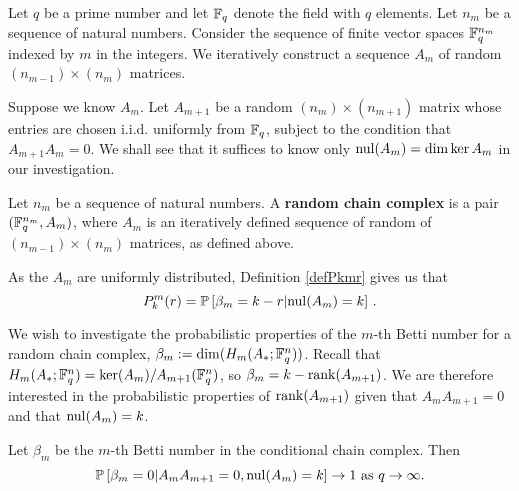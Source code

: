Let $q$ be a prime number and let $\mathbb{F}_q$ denote the field with $q$ elements. Let $n_m$ be a sequence of natural numbers. Consider the sequence of finite vector spaces $\mathbb{F}_q^{n_m}$ indexed by $m$ in the integers.  We iteratively construct a sequence $A_m$ of random $(n_{m-1})\times (n_m)$ matrices.

Suppose we know $A_{m}$. Let $A_{m+1}$ be a random $(n_{m})\times (n_{m+1})$ matrix whose entries are chosen i.i.d. uniformly from $\mathbb{F}_q$, subject to the condition that $A_{m+1}A_{m} = 0$. We shall see that it suffices to know only $\mathrm{nul}(A_m) = \dim\ker A_{m}$ in our investigation.

\begin{definition}
Let $n_m$ be a sequence of natural numbers. A \textbf{random chain complex} is a pair $(\mathbb{F}_q^{n_m},A_m)$, where $A_m$ is an iteratively defined sequence of random of $(n_{m-1})\times (n_m)$ matrices, as defined above.  
\end{definition}

As the $A_m$ are uniformly distributed, Definition \ref{defPkmr} gives us that
\[
P^m_k(r) = \mathbb{P}\left[\beta_m = k-r | \mathrm{nul}(A_{m}) = k\right] \, .
\]

We wish to investigate the probabilistic properties of the $m$-th Betti number for a random chain complex, $\beta_m := \dim(H_m(A_\ast; \mathbb{F}_q^{n}))$.  Recall that $H_m(A_\ast;\mathbb{F}_q^{n}) = \ker (A_{m})/ A_{m+1}(\mathbb{F}_q^{n})$, so $\beta_m = k - \operatorname{\mathrm{rank}}(A_{m+1})$.  We are therefore interested in the probabilistic properties of $\operatorname{\mathrm{rank}}(A_{m+1})$ given that $A_{m}A_{m+1} = 0$ and that $\mathrm{nul}(A_{m}) = k$. 


\begin{theorem} 
Let $\beta_m$ be the $m$-th Betti number in the conditional chain complex.  Then 
\[
\mathbb{P}\left[\beta_m=0| A_{m}A_{m+1} = 0, \mathrm{nul}(A_{m}) = k \right] \to 1 \textrm{ as } q\to\infty.
\]
\end{theorem}

